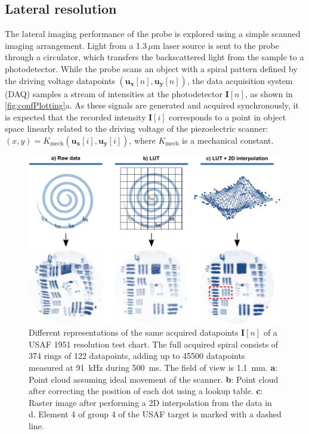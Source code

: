 \documentclass[10pt]{iopart}
\begin{document}
\subsection{Lateral resolution}
The lateral imaging performance of the probe is explored using a simple scanned imaging arrangement. Light from a 1.3\,$\mu$m laser source is sent to the probe through a circulator, which transfers the backscattered light from the sample to a photodetector. While the probe scans an object with a spiral pattern defined by the driving voltage datapoints $(\mathbf{u_x}[n], \mathbf{u_y}[n])$, the data acquisition system (DAQ) samples a stream of intensities at the photodetector $\mathbf{I}[n]$, as shown in \autoref{fig:confPlotting}a. As these signals are generated and acquired synchronously, it is expected that the recorded intensity $\mathbf{I}[i]$ corresponds to a point in object space linearly related to the driving voltage of the piezoelectric scanner: $(x, y) = K_\mathrm{mech}(\mathbf{u_x}[i], \mathbf{u_y}[i])$, where $K_\mathrm{mech}$ is a mechanical constant.

\begin{figure}[h!]\centering \includegraphics[width=\columnwidth]{figures/PlottingMark.pdf}
      \caption{Different representations of the same acquired datapoints $\mathbf{I}[n]$ of a USAF 1951 resolution test chart. The full acquired spiral consists of 374 rings of 122 datapoints, adding up to 45500 datapoints measured at \SI{91}{\kilo\hertz} during \SI{500}{\milli\second}. The field of view is \SI{1.1}{\milli\meter}.
      \textbf{a}: Point cloud assuming ideal movement of the scanner.
      \textbf{b}: Point cloud after correcting the position of each dot using a lookup table.
      \textbf{c}: Raster image after performing a 2D interpolation from the data in d. Element 4 of group 4 of the USAF target is marked with a dashed line.}
      \label{fig:confPlotting}
\end{figure}
\end{document}
